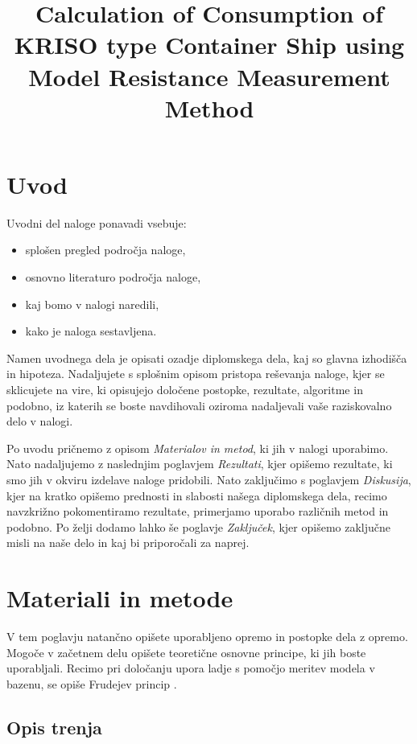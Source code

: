 \documentclass[pomnav, tisk]{fppthesis}
\title{Calculation of Consumption of KRISO type Container Ship using Model Resistance Measurement Method}
\begin{document}
\section{Uvod}
\label{sec:Uvod}

Uvodni del naloge ponavadi vsebuje:

\begin{itemize}[nosep]
	\item splošen pregled področja naloge,
	\item osnovno literaturo področja naloge,
	\item kaj bomo v nalogi naredili,
	\item kako je naloga sestavljena.
\end{itemize}

Namen uvodnega dela je opisati ozadje diplomskega dela, kaj so glavna izhodišča in hipoteza. Nadaljujete s splošnim opisom pristopa reševanja naloge, kjer se sklicujete na vire, ki opisujejo določene postopke, rezultate, algoritme in podobno, iz katerih se boste navdihovali oziroma nadaljevali vaše raziskovalno delo v nalogi.

Po uvodu pričnemo z opisom \textit{Materialov in metod}, ki jih v nalogi uporabimo. Nato nadaljujemo z naslednjim poglavjem \textit{Rezultati}, kjer opišemo rezultate, ki smo jih v okviru izdelave naloge pridobili. Nato zaključimo s poglavjem \textit{Diskusija}, kjer na kratko opišemo prednosti in slabosti našega diplomskega dela, recimo navzkrižno pokomentiramo rezultate, primerjamo uporabo različnih metod in podobno. Po želji dodamo lahko še poglavje \textit{Zaključek}, kjer opišemo zaključne misli na naše delo in kaj bi priporočali za naprej.


\newpage
\section{Materiali in metode}
\label{sec:Materiali}

V tem poglavju natančno opišete uporabljeno opremo in postopke dela z opremo. Mogoče v začetnem delu opišete teoretične osnovne principe, ki jih boste uporabljali. Recimo pri določanju upora ladje s pomočjo meritev modela v bazenu, se opiše Frudejev princip \cite{froude1888resistance}.

\subsection{Opis trenja}
\end{document}
